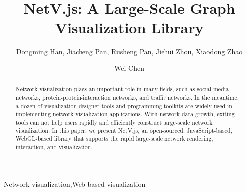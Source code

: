 \documentclass[5p]{elsarticle}
\newcommand{\name}{NetV.js\xspace}
\begin{document}
\begin{CJK}{UTF8}{gbsn}
\begin{frontmatter}

\title{\name: A Large-Scale Graph Visualization Library}

\author[mymainaddress,mysecondaryaddress]{Dongming Han, Jiacheng Pan, Rusheng Pan, Jiehui Zhou, Xiaodong Zhao}
\author[mymainaddress]{Wei Chen}

\address[mymainaddress]{State Key Lab of CAD\&CG, Zhejiang University, Hangzhou, Zhejiang, China}
\address[mysecondaryaddress]{Zhejiang Lab, hangzhou, zhejiang, China}

\begin{abstract}
    Network visualization plays an important role in many fields, such as social media networks, protein-protein-interaction networks, and traffic networks. In the meantime, a dozen of visualization designer tools and programming toolkits are widely used in implementing network visualization applications. With network data growth, exiting tools can not help users rapidly and efficiently construct large-scale network visualization.
    In this paper, we present \name, an open-sourced, JavaScript-based, WebGL-based library that supports the rapid large-scale network rendering, interaction, and visualization.
    
\end{abstract}

\begin{keyword}
Network visualization\sep Web-based visualization
\end{keyword}

\end{frontmatter}

\linenumbers










\end{CJK}
\end{document}

